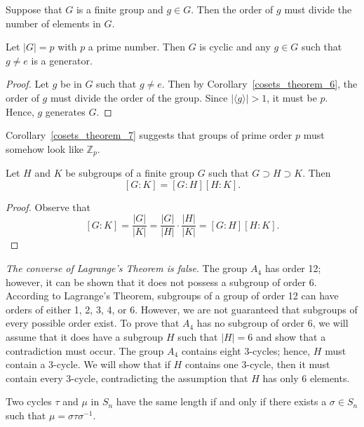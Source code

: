 \begin{corollary}\label{cosets_theorem_6}
Suppose that $G$ is a finite group and $g \in G$.  Then the order of $g$ must divide the number of elements in $G$. 
\end{corollary}

\begin{corollary}\label{cosets_theorem_7}
Let $|G| = p$ with $p$ a prime number.  Then $G$ is cyclic and any $g \in G$ such that $g \neq e$ is a generator. 
\end{corollary}

 
\begin{proof}
Let $g$ be in $G$ such that $g \neq e$.  Then by Corollary~\ref{cosets_theorem_6}, the order of $g$ must divide the order of the group. Since $|\langle g \rangle| > 1$, it must be $p$.  Hence, $g$ generates $G$. 
\end{proof}

\medskip

Corollary~\ref{cosets_theorem_7} suggests that groups of prime order $p$ must somehow look like ${\mathbb Z}_p$. 

\begin{corollary}\label{cosets_theorem_8}
Let $H$ and $K$ be subgroups of a finite group $G$ such that $G \supset H \supset K$.  Then 
$$
[G:K] = [G:H][H:K].
$$
\end{corollary}
 
\begin{proof}
Observe that
$$
[G:K] = \frac{|G|}{|K|} = \frac{|G|}{|H|} \cdot
\frac{|H|}{|K|} = [G:H][H:K].
$$
\end{proof}

\medskip
 
{\em The converse of Lagrange's Theorem is false}.  The group $A_4$ has order 12; however, it can be shown that it does not possess a subgroup of order 6.  According to Lagrange's Theorem, subgroups of a group of order 12 can have orders of either 1, 2, 3, 4, or  6.  However, we are not guaranteed that subgroups of every possible order exist.  To prove that $A_4$ has no subgroup of order 6, we will assume that it does have a subgroup $H$ such that $|H|=6$ and show that a contradiction must occur.  The group $A_4$ contains eight 3-cycles; hence, $H$ must contain a 3-cycle.  We will show that if $H$ contains one 3-cycle, then it must contain every 3-cycle, contradicting the assumption that $H$ has only 6 elements.

\begin{theorem}\label{cosets_theorem_9}
Two cycles $\tau$ and $\mu$ in $S_n$ have the same length if and only if there exists a $\sigma \in S_n$ such that $\mu = \sigma \tau \sigma^{-1}$.  
\end{theorem}
 
